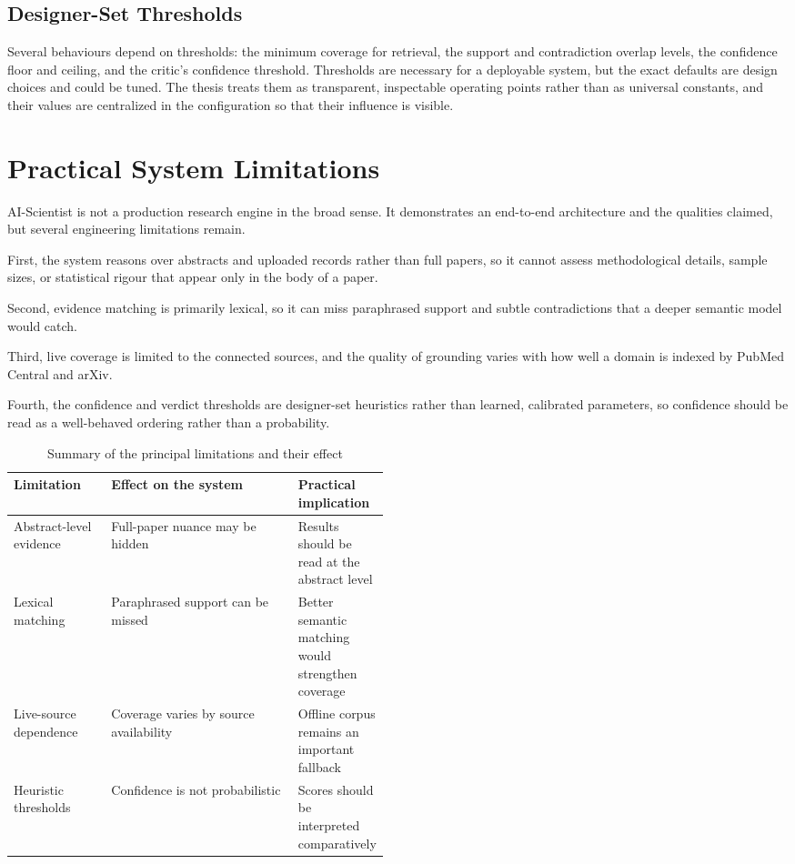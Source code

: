 \subsection{Designer-Set Thresholds }

Several behaviours depend on thresholds: the minimum coverage for retrieval, the support and contradiction overlap
levels, the confidence floor and ceiling, and the critic's confidence threshold. Thresholds are necessary for a
deployable system, but the exact defaults are design choices and could be tuned. The thesis treats them as
transparent, inspectable operating points rather than as universal constants, and their values are centralized in
the configuration so that their influence is visible.

\section{Practical System Limitations }

AI-Scientist is not a production research engine in the broad sense. It demonstrates an end-to-end architecture and
the qualities claimed, but several engineering limitations remain.

First, the system reasons over abstracts and uploaded records rather than full papers, so it cannot assess
methodological details, sample sizes, or statistical rigour that appear only in the body of a paper.

Second, evidence matching is primarily lexical, so it can miss paraphrased support and subtle contradictions that a
deeper semantic model would catch.

Third, live coverage is limited to the connected sources, and the quality of grounding varies with how well a domain
is indexed by PubMed Central and arXiv.

Fourth, the confidence and verdict thresholds are designer-set heuristics rather than learned, calibrated
parameters, so confidence should be read as a well-behaved ordering rather than a probability.

\begin{table}[!htbp]
\centering
\caption{Summary of the principal limitations and their effect}
\begin{tabularx}{0.95\linewidth}{>{\raggedright\arraybackslash}p{0.26\linewidth} >{\raggedright\arraybackslash}X >{\raggedright\arraybackslash}p{0.22\linewidth}}
\toprule
Limitation & Effect on the system & Practical implication \\
\midrule
Abstract-level evidence & Full-paper nuance may be hidden & Results should be read at the abstract level \\
Lexical matching & Paraphrased support can be missed & Better semantic matching would strengthen coverage \\
Live-source dependence & Coverage varies by source availability & Offline corpus remains an important fallback \\
Heuristic thresholds & Confidence is not probabilistic & Scores should be interpreted comparatively \\
\bottomrule
\end{tabularx}
\end{table}

